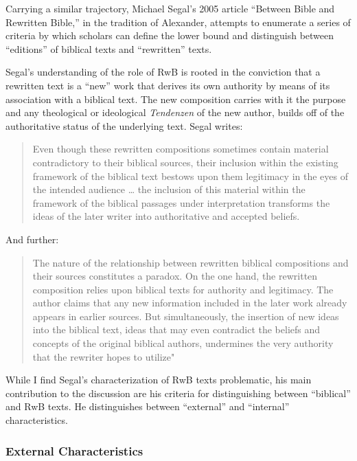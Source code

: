 Carrying a similar trajectory, Michael Segal's 2005 article ``Between Bible and Rewritten Bible,'' in the tradition of Alexander, attempts to enumerate a series of criteria by which scholars can define the lower bound and distinguish between ``editions'' of biblical texts and ``rewritten'' texts. 

Segal's understanding of the role of RwB is rooted in the conviction that a rewritten text is a ``new'' work that derives its own authority by means of its association with a biblical text. The new composition carries with it the purpose and any theological or ideological \emph{Tendenzen} of the new author, builds off of the authoritative status of the underlying text.\autocite[11]{segal_henze2005} Segal writes: 

\begin{quote}
    Even though these rewritten compositions sometimes contain material contradictory to their biblical sources, their inclusion within the existing framework of the biblical text bestows upon them legitimacy in the eyes of the intended audience \ldots{} the inclusion of this material within the framework of the biblical passages under interpretation transforms the ideas of the later writer into authoritative and accepted beliefs.\autocite[11]{segal_henze2005}
\end{quote} 

 And further: 

\begin{quote}
    The nature of the relationship between rewritten biblical compositions and their sources constitutes a paradox. On the one hand, the rewritten composition relies upon biblical texts for authority and legitimacy. The author claims that any new information included in the later work already appears in earlier sources. But simultaneously, the insertion of new ideas into the biblical text, ideas that may even contradict the beliefs and concepts of the original biblical authors, undermines the very authority that the rewriter hopes to utilize"\autocite[11-12]{segal_henze2005}
\end{quote} 

While I find Segal's characterization of RwB texts problematic,%
%
%
his main contribution to the discussion are his criteria for distinguishing between ``biblical'' and RwB texts. He distinguishes between ``external'' and ``internal'' characteristics. 

\subsubsection{External Characteristics}

